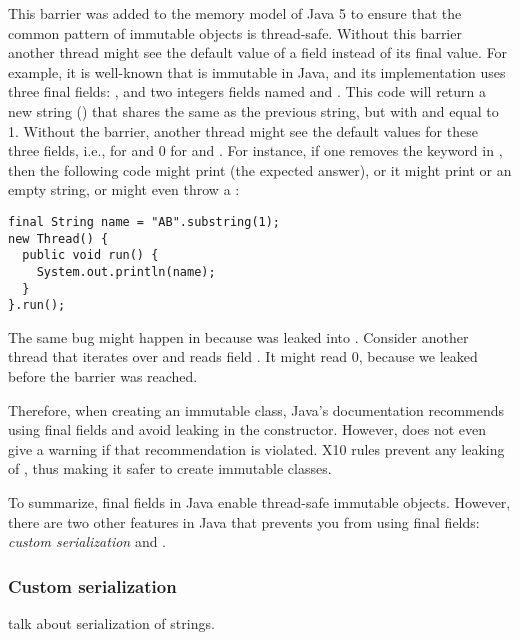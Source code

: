 This barrier was added to the memory model of Java 5
    to ensure that the common pattern of immutable objects is thread-safe.
Without this barrier another thread might see the default value of a field
    instead of its final value.
For example, it is well-known that  is immutable in Java,
    and its implementation uses three {final} fields:
    , and two integers fields named  and .
This code  will return a new string ()
    that shares
    the same  as the previous string, %
    but with  and  equal to 1.
Without the barrier, %
    another thread might see the default values for these three fields,
    i.e.,  for  and 0 for  and .
For instance,
    if one removes the  keyword in ,
    then
    the following code might print  (the expected answer),
    or it might print
     or an empty string,
    or might even throw a :
\begin{lstlisting}
final String name = "AB".substring(1);
new Thread() {
  public void run() {
    System.out.println(name);
  }
}.run();
\end{lstlisting}

The same bug might happen in 
    because \this was leaked into .
Consider another thread that iterates over  and reads field .
It might read 0, because we leaked \this before the barrier was reached.

Therefore, when creating an immutable class,
    Java's documentation recommends using final fields
    and avoid leaking \this in the constructor.
However,  does not even give a warning if that recommendation is violated.
X10 rules prevent any leaking of \this,
    thus making it safer to create immutable classes.

To summarize, final fields in Java
    enable thread-safe immutable objects.
However, there are two other features in Java that prevents you from using {final} fields:
    \emph{custom serialization} and .

\subsubsection{Custom serialization}
talk about serialization of strings.

